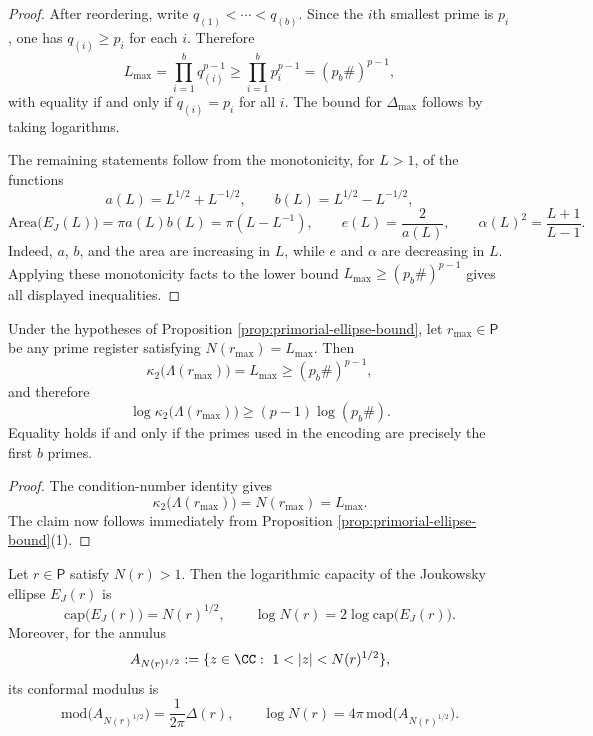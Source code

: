 \begin{proof}
After reordering, write \(q_{(1)}<\cdots<q_{(b)}\). Since the \(i\)th smallest prime is \(p_i\), one has \(q_{(i)}\ge p_i\) for each \(i\). Therefore
\[
L_{\max}
=\prod_{i=1}^{b}q_{(i)}^{p-1}
\ge
\prod_{i=1}^{b}p_i^{p-1}
=(p_b\#)^{p-1},
\]
with equality if and only if \(q_{(i)}=p_i\) for all \(i\). The bound for \(\Delta_{\max}\) follows by taking logarithms.

The remaining statements follow from the monotonicity, for \(L>1\), of the functions
\[
a(L)=L^{1/2}+L^{-1/2},
\qquad
b(L)=L^{1/2}-L^{-1/2},
\]
\[
\mathrm{Area}\bigl(E_J(L)\bigr)=\pi a(L)b(L)=\pi(L-L^{-1}),
\qquad
e(L)=\frac{2}{a(L)},
\qquad
\alpha(L)^2=\frac{L+1}{L-1}.
\]
Indeed, \(a\), \(b\), and the area are increasing in \(L\), while \(e\) and \(\alpha\) are decreasing in \(L\). Applying these monotonicity facts to the lower bound \(L_{\max}\ge (p_b\#)^{p-1}\) gives all displayed inequalities.
\end{proof}

\begin{corollary}\label{cor:primorial-condition-number-bound}
Under the hypotheses of Proposition \ref{prop:primorial-ellipse-bound}, let \(r_{\max}\in\mathsf P\) be any prime register satisfying \(N(r_{\max})=L_{\max}\). Then
\[
\kappa_2\bigl(\Lambda(r_{\max})\bigr)=L_{\max}\ge (p_b\#)^{p-1},
\]
and therefore
\[
\log\kappa_2\bigl(\Lambda(r_{\max})\bigr)\ge (p-1)\log(p_b\#).
\]
Equality holds if and only if the primes used in the encoding are precisely the first \(b\) primes.
\end{corollary}

\begin{proof}
The condition-number identity gives
\[
\kappa_2\bigl(\Lambda(r_{\max})\bigr)=N(r_{\max})=L_{\max}.
\]
The claim now follows immediately from Proposition \ref{prop:primorial-ellipse-bound}(1).
\end{proof}

\begin{corollary}\label{cor:capacity-modulus-koenigs}
Let \(r\in\mathsf P\) satisfy \(N(r)>1\). Then the logarithmic capacity of the Joukowsky ellipse \(E_J(r)\) is
\[
\mathrm{cap}\bigl(E_J(r)\bigr)=N(r)^{1/2},
\qquad
\log N(r)=2\log\mathrm{cap}\bigl(E_J(r)\bigr).
\]
Moreover, for the annulus
\[
A_{N(r)^{1/2}}:=\{z\in\CC:\ 1<|z|<N(r)^{1/2}\},
\]
its conformal modulus is
\[
\mathrm{mod}\bigl(A_{N(r)^{1/2}}\bigr)
=\frac{1}{2\pi}\Delta(r),
\qquad
\log N(r)=4\pi\,\mathrm{mod}\bigl(A_{N(r)^{1/2}}\bigr).
\]
\end{corollary}

